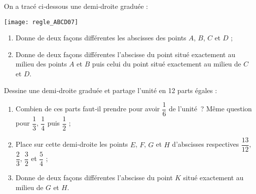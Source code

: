\begin{activite}

\begin{partie}
On a tracé ci‑dessous une demi‑droite graduée :
\begin{center} \texttt{[image: regle\_ABCD07]} \end{center}
\begin{enumerate}
 \item Donne de deux façons différentes les abscisses des points $A$, $B$, $C$ et $D$ ;
 \item Donne de deux façons différentes l'abscisse du point situé exactement au milieu des points $A$ et $B$ puis celui du point situé exactement au milieu de $C$ et $D$.
 \end{enumerate}
\end{partie}

\begin{partie}
Dessine une demi‑droite graduée et partage l'unité en 12 parts égales :
\begin{enumerate}
 \item Combien de ces parts faut‑il prendre pour avoir $\dfrac{1}{6}$ de l'unité ? Même question pour $\dfrac{1}{3}$, $\dfrac{1}{4}$ puis $\dfrac{1}{2}$ ;
 \item Place sur cette demi‑droite les points $E$, $F$, $G$ et $H$ d'abscisses respectives $\dfrac{13}{12}$, $\dfrac{2}{3}$, $\dfrac{3}{2}$ et $\dfrac{5}{4}$ ;
 \item Donne de deux façons différentes l'abscisse du point $K$ situé exactement au milieu de $G$ et $H$.
 \end{enumerate}
\end{partie}

\end{activite}


